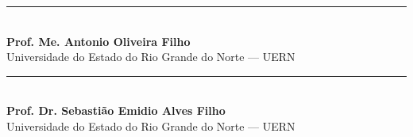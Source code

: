 \vspace{1.0cm}

\noindent
\begin{minipage}[t]{0.48\textwidth}
  \centering
  \rule{6.4cm}{0.4pt}\\[0.15cm]
  \textbf{Prof. Me. Antonio Oliveira Filho}\\
  Universidade do Estado do Rio Grande do Norte --- UERN
\vspace{2.5cm}
\end{minipage}\hfill
\begin{minipage}[t]{0.48\textwidth}
  \centering
  \rule{6.4cm}{0.4pt}\\[0.15cm]
  \textbf{Prof. Dr. Sebastião Emidio Alves Filho}\\
  Universidade do Estado do Rio Grande do Norte --- UERN
\vspace{2.5cm}
\end{minipage}

\clearpage
